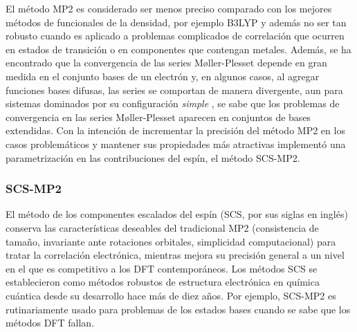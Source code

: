El m\'etodo MP2 es considerado ser menos preciso comparado con los
mejores m\'etodos de funcionales de la densidad, por ejemplo B3LYP 
\citep{Grim2003} y adem\'as no ser tan robusto cuando es aplicado a
problemas complicados de correlaci\'on que ocurren en estados de 
transici\'on o en componentes que contengan metales. Adem\'as, se ha
encontrado que la convergencia de las series M\o ller-Plesset depende
en gran medida en el conjunto bases de un electr\'on y, en algunos 
casos, al agregar funciones bases difusas, las series se comportan de
manera divergente, aun para sistemas dominados por su configuraci\'on
{\it simple} \citep{Olse1996}, se sabe que los problemas de 
convergencia en las series M\o ller-Plesset aparecen en conjuntos de 
bases extendidas. Con la intenci\'on de incrementar la precisi\'on 
del m\'etodo MP2 en los casos problem\'aticos y mantener sus 
propiedades m\'as atractivas \cite{Grim2003} implement\'o una 
parametrizaci\'on en las contribuciones del esp\'in, el m\'etodo 
SCS-MP2.

\subsubsection{SCS-MP2}

El m\'etodo de los componentes escalados del esp\'in (SCS, por sus 
siglas en ingl\'es) conserva las caracter\'isticas deseables del 
tradicional MP2 (consistencia de tama\~no, invariante ante rotaciones
orbitales, simplicidad computacional) para tratar la correlaci\'on 
electr\'onica, mientras mejora su precisi\'on general a un nivel en 
el que es competitivo a los DFT contempor\'aneos. Los m\'etodos SCS 
se establecieron como m\'etodos robustos de estructura electr\'onica 
en qu\'imica cu\'antica desde su desarrollo hace m\'as de diez 
a\~nos. Por ejemplo, SCS-MP2 es rutinariamente usado para problemas 
de los estados bases cuando se sabe que los m\'etodos DFT fallan.



